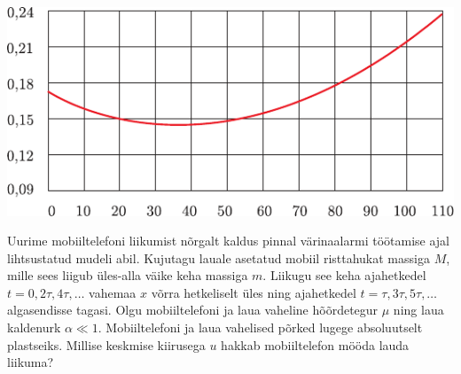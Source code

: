 \documentclass[10pt]{article}
\begin{document}
{\begin{center}
	\includegraphics[width=\linewidth]{2006-lahg-10-yl}
\end{center}
\probend
\bigskip


Uurime mobiiltelefoni liikumist nõrgalt kaldus pinnal värinaalarmi töötamise
ajal lihtsustatud mudeli abil.
Kujutagu lauale asetatud mobiil risttahukat massiga $M$, mille sees liigub
üles-alla väike keha massiga $m$.
Liikugu see keha ajahetkedel $t=0, 2\tau, 4\tau, \ldots$ vahemaa $x$ võrra
hetkeliselt üles ning ajahetkedel $t=\tau, 3\tau, 5\tau, \ldots$ algasendisse
tagasi.
Olgu mobiiltelefoni ja laua vaheline hõõrdetegur $\mu$ ning laua kaldenurk
$\alpha \ll 1$. Mobiiltelefoni ja laua vahelised põrked lugege absoluutselt
plastseiks.
Millise keskmise kiirusega $u$ hakkab mobiiltelefon mööda lauda liikuma?
\probend
\bigskip


}
\end{document}
